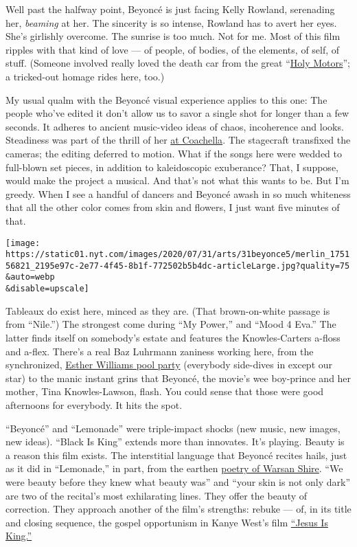 Well past the halfway point, Beyoncé is just facing Kelly Rowland,
serenading her, \emph{beaming} at her. The sincerity is so intense,
Rowland has to avert her eyes. She's girlishly overcome. The sunrise is
too much. Not for me. Most of this film ripples with that kind of love
--- of people, of bodies, of the elements, of self, of stuff. (Someone
involved really loved the death car from the great
``\href{https://sgtr.files.wordpress.com/2013/01/holy-motors2.png}{Holy
Motors}''; a tricked-out homage rides here, too.)

My usual qualm with the Beyoncé visual experience applies to this one:
The people who've edited it don't allow us to savor a single shot for
longer than a few seconds. It adheres to ancient music-video ideas of
chaos, incoherence and looks. Steadiness was part of the thrill of her
\href{https://www.nytimes.com/2018/04/15/arts/music/beyonce-coachella-review.html}{at
Coachella}. The stagecraft transfixed the cameras; the editing deferred
to motion. What if the songs here were wedded to full-blown set pieces,
in addition to kaleidoscopic exuberance? That, I suppose, would make the
project a musical. And that's not what this wants to be. But I'm greedy.
When I see a handful of dancers and Beyoncé awash in so much whiteness
that all the other color comes from skin and flowers, I just want five
minutes of that.

\texttt{[image: https://static01.nyt.com/images/2020/07/31/arts/31beyonce5/merlin\_175156821\_2195e97c-2e77-4f45-8b1f-772502b5b4dc-articleLarge.jpg?quality=75\\\&auto=webp\\\&disable=upscale]}

Tableaux do exist here, minced as they are. (That brown-on-white passage
is from ``Nile.'') The strongest come during ``My Power,'' and ``Mood 4
Eva.'' The latter finds itself on somebody's estate and features the
Knowles-Carters a-floss and a-flex. There's a real Baz Luhrmann zaniness
working here, from the synchronized,
\href{https://www.youtube.com/watch?v=gsp-LE_agns}{Esther Williams pool
party} (everybody side-dives in except our star) to the manic instant
grins that Beyoncé, the movie's wee boy-prince and her mother, Tina
Knowles-Lawson, flash. You could sense that those were good afternoons
for everybody. It hits the spot.

``Beyoncé'' and ``Lemonade'' were triple-impact shocks (new music, new
images, new ideas). ``Black Is King'' extends more than innovates. It's
playing. Beauty is a reason this film exists. The interstitial language
that Beyoncé recites hails, just as it did in ``Lemonade,'' in part,
from the earthen
\href{https://www.poetryfoundation.org/poets/warsan-shire}{poetry of
Warsan Shire}. ``We were beauty before they knew what beauty was'' and
``your skin is not only dark'' are two of the recital's most
exhilarating lines. They offer the beauty of correction. They approach
another of the film's strengths: rebuke --- of, in its title and closing
sequence, the gospel opportunism in Kanye West's film
\href{https://www.nytimes.com/2019/10/27/arts/music/kanye-west-jesus-is-king-review.html}{``Jesus
Is King.''}

